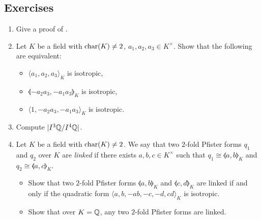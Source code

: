 \documentclass[12pt, leqno, british]{amsart}
\begin{document}
\subsection{Exercises}
\begin{enumerate}
\item Give a proof of .
\item\label{ex:3-dim-reduction} Let $K$ be a field with $\operatorname{char}(K) \neq 2$, $a_1, a_2, a_3 \in K^\times$.
Show that the following are equivalent:
\begin{itemize}
\item $\langle a_1, a_2, a_3 \rangle_{K}$ is isotropic,
\item $\llangle -a_2a_3, -a_1a_3 \rrangle_K$ is isotropic,
\item $\langle 1, -a_2a_3, -a_1a_3 \rangle_K$ is isotropic.
\end{itemize}
\item Compute $\lvert I^3 \mathbb Q/I^4 \mathbb Q \rvert$.
\item Let $K$ be a field with $\operatorname{char}(K) \neq 2$.
We say that two $2$-fold Pfister forms $q_1$ and $q_2$ over $K$ are \emph{linked} if there exists $a, b, c \in K^\times$ such that $q_1 \cong \llangle a, b \rrangle_K$ and $q_2 \cong \llangle a, c \rrangle_K$.
\begin{itemize}
\item Show that two $2$-fold Pfister forms $\llangle a, b \rrangle_K$ and $\llangle c, d \rrangle_K$ are linked if and only if the quadratic form $\langle a, b, -ab, -c, -d, cd \rangle_K$ is isotropic.
\item Show that over $K = \mathbb Q$, any two $2$-fold Pfister forms are linked.
\end{itemize}
\end{enumerate}
\end{document}
